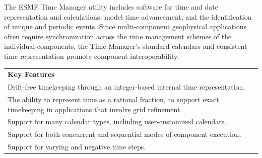 
The ESMF Time Manager utility includes software for time and date 
representation and calculations, model time advancement, and the 
identification of unique and periodic events.  Since multi-component 
geophysical applications often require synchronization across
the time management schemes of the individual components, the 
Time Manager's standard calendars and consistent time representation 
promote component interoperability.
\begin{center}  
\begin{tabular}{|p{6in}|}
\hline
\vspace{.01in}
{\bf Key Features} \\[.01in]
Drift-free timekeeping through an integer-based internal time 
representation. \\
The ability to represent time as a rational fraction, to support 
exact timekeeping in applications that involve grid refinement. \\
Support for many calendar types, including user-customized calendars. \\
Support for both concurrent and sequential modes of component execution. \\
Support for varying and negative time steps. \\[.03in] \hline
\end{tabular}
\end{center}

